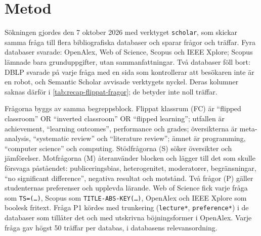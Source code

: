 \section{Metod}
\label{sec:recap-flippat-metod}

Sökningen gjordes den 7 oktober 2026 med verktyget \texttt{scholar}, som
skickar samma fråga till flera bibliografiska databaser och sparar frågor
och träffar.  Fyra databaser svarade: OpenAlex, Web of Science, Scopus och
IEEE Xplore; Scopus lämnade bara grunduppgifter, utan sammanfattningar.
Två databaser föll bort: DBLP svarade på varje fråga med en sida som
kontrollerar att besökaren inte är en robot, och Semantic Scholar avvisade
verktygets nyckel.  Deras kolumner saknas därför i
\cref{tab:recap-flippat-fragor}; de betyder inte noll träffar.

Frågorna byggs av samma begreppsblock.  Flippat klassrum (FC) är
\enquote{flipped classroom} OR \enquote{inverted classroom} OR
\enquote{flipped learning}; utfallen är achievement, \enquote{learning
outcomes}, performance och grades; översikterna är meta-analysis,
\enquote{systematic review} och \enquote{literature review}; ämnet är
programming, \enquote{computer science} och computing.  Stödfrågorna (S)
söker översikter och jämförelser.  Motfrågorna (M) återanvänder blocken och
lägger till det som skulle försvaga påståendet: publiceringsbias,
heterogenitet, moderatorer, begränsningar, \enquote{no significant
difference}, negativa resultat och motstånd.  Två frågor (P) gäller
studenternas preferenser och upplevda lärande.  Web of Science fick varje
fråga som \texttt{TS=(\dots)}, Scopus som \texttt{TITLE-ABS-KEY(\dots)},
OpenAlex och IEEE Xplore som boolesk fritext.  Fråga P1 kördes med
trunkering (\texttt{lecture*}, \texttt{preference*}) i de databaser som
tillåter det och med utskrivna böjningsformer i OpenAlex.  Varje fråga gav
högst 50 träffar per databas, i databasens relevansordning.

